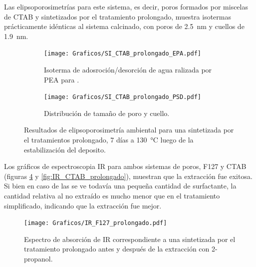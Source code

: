 {		Las elipsoporosimetrías para este sistema, es decir, poros formados por miscelas de CTAB y sintetizados por el tratamiento prolongado, muestra isotermas prácticamente idénticas al sistema calcinado, con poros de \SI{2,5}{nm} y cuellos de \SI{1,9}{nm}.
			     
		 \begin{figure}[!ht]
		  	\begin{subfigure}[t]{0.495\textwidth}
		  	\texttt{[image: Graficos/SI\_CTAB\_prolongado\_EPA.pdf]}
			\caption{Isoterma de adosroción/desorción de agua ralizada por PEA para \pdmC\space.}
			\label{fig:CTAB_prolongado_EPA}
			\end{subfigure}
			\begin{subfigure}[t]{0.495\textwidth}
		  	\texttt{[image: Graficos/SI\_CTAB\_prolongado\_PSD.pdf]}
			\caption{Distribución de tamaño de poro y cuello.\\ }
			\label{fig:CTAB_prolongado_PSD}
			\end{subfigure}
			\caption[Elipsoporosimetría \pdmC\space tratamiento prolongado.]{Resultados de elipsoporosimetría ambiental para una \pdmC\space sintetizada por el tratamientos prolongado, 7 días a \SI{130}{\celsius} luego de la estabilización del deposito.}
			\end{figure}

		Los gráficos de espectroscopia IR para ambos sistemas de poros, F127 y CTAB (figuras \ref{fig:IR_F127_prolongado} y \ref{fig:IR_CTAB_prolongado}),  muestran que la extracción fue exitosa. Si bien en caso de las \pdmC\space se ve todavía una pequeña cantidad de surfactante, la cantidad relativa al no extraído es mucho menor que en el tratamiento simplificado, indicando que la extracción fue mejor. %
		
		\begin{figure}[!ht]
			\begin{center}
			\texttt{[image: Graficos/IR\_F127\_prolongado.pdf]}
			\caption[FTIR \pdmF\space tratamiento prolongado.]{Espectro de absorción de IR correspondiente a una \pdmF\space sintetizada por el tratamiento prolongado antes y después de la extracción con 2-propanol.}
			\label{fig:IR_F127_prolongado}
			\end{center}
			\end{figure}
		
}
